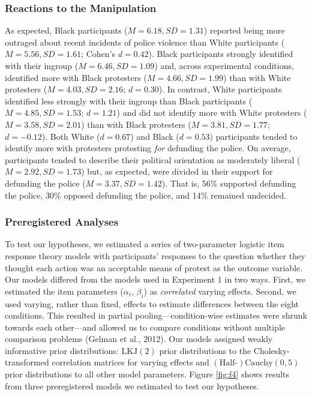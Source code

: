 \documentclass[12pt, letterpaper]{article}
\begin{document}
\hypertarget{reactions-to-the-manipulation-1}{%
\subsubsection{Reactions to the
Manipulation}\label{reactions-to-the-manipulation-1}}

As expected, Black participants (\(M = 6.18, \textit{SD} = 1.31\))
reported being more outraged about recent incidents of police violence
than White participants (\(M = 5.56, \textit{SD} = 1.61\); Cohen's
\(d = 0.42\)). Black participants strongly identified with their ingroup
(\(M = 6.46, \textit{SD} = 1.09\)) and, across experimental conditions,
identified more with Black protesters (\(M = 4.66, \textit{SD} = 1.99\))
than with White protesters (\(M = 4.03, \textit{SD} = 2.16\);
\(d = 0.30\)). In contrast, White participants identified less strongly
with their ingroup than Black participants
(\(M = 4.85, \textit{SD} = 1.53\); \(d = 1.21\)) and did not identify
more with White protesters (\(M = 3.58, \textit{SD} = 2.01\)) than with
Black protesters (\(M = 3.81, \textit{SD} = 1.77\); \(d = -0.12\)). Both
White (\(d = 0.67\)) and Black (\(d = 0.53\)) participants tended to
identify more with protesters protesting \emph{for} defunding the
police. On average, participants tended to describe their political
orientation as moderately liberal (\(M = 2.92, \textit{SD} = 1.73\))
but, as expected, were divided in their support for defunding the police
(\(M = 3.37, \textit{SD} = 1.42\)). That is, 56\% supported defunding
the police, 30\% opposed defunding the police, and 14\% remained
undecided.

\hypertarget{preregistered-analyses-1}{%
\subsubsection{Preregistered Analyses}\label{preregistered-analyses-1}}

To test our hypotheses, we estimated a series of two-parameter logistic
item response theory models with participants' responses to the question
whether they thought each action was an acceptable means of protest as
the outcome variable. Our models differed from the models used in
Experiment 1 in two ways. First, we estimated the item parameters
(\(\alpha_i\), \(\beta_i\)) as \emph{correlated} varying effects.
Second, we used varying, rather than fixed, effects to estimate
differences between the eight conditions. This resulted in partial
pooling---condition-wise estimates were shrunk towards each other---and
allowed us to compare conditions without multiple comparison problems
(Gelman et al., 2012). Our models assigned weakly informative prior
distributions: \(\text{LKJ} (2)\) prior distributions to the
Cholesky-transformed correlation matrices for varying effects and
\((\text{Half-})\text{Cauchy} (0, 5)\) prior distributions to all other
model parameters. Figure \ref{fig:f4} shows results from three
preregistered models we estimated to test our hypotheses.
\end{document}

